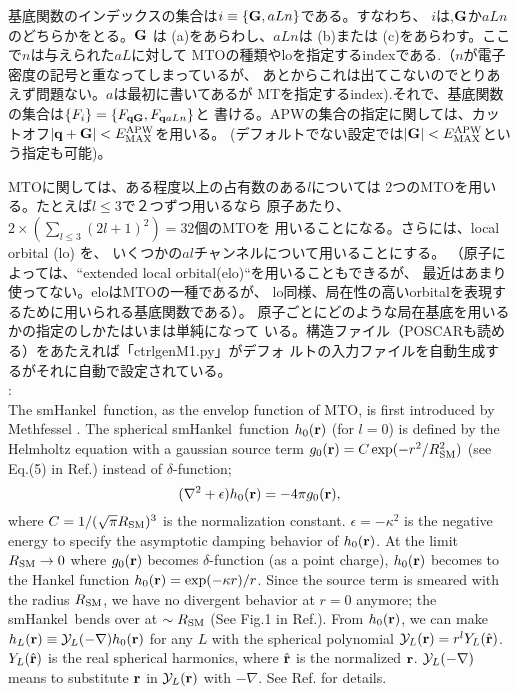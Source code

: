 \documentclass[twocolumn,showpacs,preprintnumbers,amsmath,amssymb,floatfix]{revtex4-1}
\newcommand{\bfq}{{\bf q}}
\newcommand{\bfr}{{\bf r}}
\newcommand{\bfG}{{\bf G}}
\newcommand{\YY}{{\cal Y}}
\def\smh{smHankel}
\def\EMAX{  E^{\rm APW}_{\rm MAX} }
\def\RSM{R_{\rm SM}}
\def\EMAX{  E^{\rm APW}_{\rm MAX} }
\def\smh{smHankel}
\def\EMAX{  E^{\rm APW}_{\rm MAX} }
\def\RSM{R_{\rm SM}}
\def\EMAX{  E^{\rm APW}_{\rm MAX} }
\def\EMAX{  E^{\rm APW}_{\rm MAX} }
\begin{document}
基底関数のインデックスの集合は$i\equiv\{\bfG,aLn\}$である。すなわち、
$i$は,$\bfG$か$aLn$のどちらかをとる。$\bfG$ は (a)をあらわし、$aLn$は (b)または
(c)をあらわす。ここで$n$は与えられた$aL$に対して
MTOの種類やloを指定するindexである.（$n$が電子密度の記号と重なってしまっているが、
あとからこれは出てこないのでとりあえず問題ない。$a$は最初に書いてあるが
MTを指定するindex).それで、基底関数の集合は$\{F_i\}=\{F_{\bfq \bfG},F_{\bfq aLn}\}$と
書ける。APWの集合の指定に関しては、カットオフ$|\bfq+\bfG|<\EMAX$を用いる。
(デフォルトでない設定では$|\bfG|<\EMAX$という指定も可能)。

MTOに関しては、ある程度以上の占有数のある$l$については
2つのMTOを用いる。たとえば$l \le 3$で２つずつ用いるなら
原子あたり、$2\times\left(\sum_{l\leq 3}(2l+1)^2\right)=32$個のMTOを
用いることになる。さらには、local orbital (lo) \cite{lo} を、
いくつかの$al$チャンネルについて用いることにする。 
（原子によっては、``extended local orbital(elo)``を用いることもできるが、
最近はあまり使ってない。eloはMTOの一種であるが、
lo同様、局在性の高いorbitalを表現するために用いられる基底関数である）。
原子ごとにどのような局在基底を用いるかの指定のしかたはいまは単純になって
いる。構造ファイル（POSCARも読める）をあたえれば「ctrlgenM1.py」がデフォ
ルトの入力ファイルを自動生成するがそれに自動で設定されている。\\

\noindent{\bf smooth Hankel function(\smh)}:\\
The \smh\ function, as the envelop function of MTO, is first introduced
by Methfessel \cite{lmfchap,Bott98}. The spherical \smh\ function
$h_0(\bfr)$ (for $l=0$) is defined by the Helmholtz equation with a
gaussian source term $g_0(\bfr) = C \exp(-r^2/\RSM^2)$ (see Eq.(5) in
Ref.\cite{lmfchap}) instead of $\delta$-function;
\begin{equation}
(\nabla^2+\epsilon)h_0(\bfr) = -4 \pi g_0(\bfr),
\label{eq:defh0}
\end{equation}
where $C=1/(\sqrt{\pi} \RSM)^3$ is the normalization constant.
$\epsilon=-\kappa^2$ is the negative energy to specify the asymptotic
damping behavior of $h_0(\bfr)$.  At the limit $\RSM \to 0$ where
$g_0(\bfr)$ becomes $\delta$-function (as a point charge), $h_0(\bfr)$
becomes to the Hankel function $h_0(\bfr)=\exp(-\kappa r)/r$.  Since the
source term is smeared with the radius $\RSM$, we have no divergent
behavior at $r=0$ anymore; the \smh\ bends over at $\sim\RSM$ (See Fig.1
in Ref.\cite{lmfchap}).  From $h_0(\bfr)$, we can make
$h_L(\bfr)\equiv\YY_L(-\nabla) h_0(\bfr)$ for any $L$ with the spherical
polynomial $\YY_L(\bfr)=r^l Y_L(\hat{\bfr})$.  $Y_L(\hat{\bfr})$ is the
real spherical harmonics, where $\hat{\bfr}$ is the normalized
$\bfr$. $\YY_L(-\nabla)$ means to substitute $\bfr$ in $\YY_L(\bfr)$
with $-\nabla$. See Ref.\cite{Bott98} for details.\\
\end{document}
